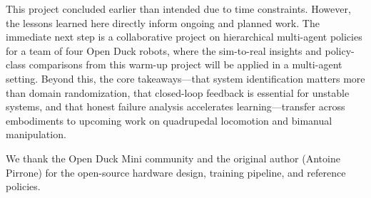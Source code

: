 \documentclass{article}
\begin{document}
This project concluded earlier than intended due to time constraints. However, the lessons learned here directly inform ongoing and planned work. The immediate next step is a collaborative project on hierarchical multi-agent policies for a team of four Open Duck robots, where the sim-to-real insights and policy-class comparisons from this warm-up project will be applied in a multi-agent setting. Beyond this, the core takeaways---that system identification matters more than domain randomization, that closed-loop feedback is essential for unstable systems, and that honest failure analysis accelerates learning---transfer across embodiments to upcoming work on quadrupedal locomotion and bimanual manipulation.


\begin{ack}
We thank the Open Duck Mini community and the original author (Antoine Pirrone) for the open-source hardware design, training pipeline, and reference policies.
\end{ack}




\end{document}
